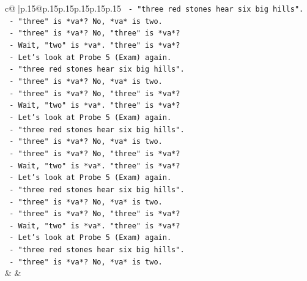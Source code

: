 \documentclass{article}
\begin{document}
{\begin{supertabular}{c@{$\;$}|p{.15\linewidth}@{}p{.15\linewidth}p{.15\linewidth}p{.15\linewidth}p{.15\linewidth}p{.15\linewidth}}
{{{\texttt{                                {-} "three red stones hear six big hills".} \\
\texttt{                                {-} "three" is *va*? No, *va* is two.} \\
\texttt{                                {-} "three" is *va*? No, "three" is *va*?} \\
\texttt{                                {-} Wait, "two" is *va*. "three" is *va*?} \\
\texttt{                                {-} Let's look at Probe 5 (Exam) again.} \\
\texttt{                                {-} "three red stones hear six big hills".} \\
\texttt{                                {-} "three" is *va*? No, *va* is two.} \\
\texttt{                                {-} "three" is *va*? No, "three" is *va*?} \\
\texttt{                                {-} Wait, "two" is *va*. "three" is *va*?} \\
\texttt{                                {-} Let's look at Probe 5 (Exam) again.} \\
\texttt{                                {-} "three red stones hear six big hills".} \\
\texttt{                                {-} "three" is *va*? No, *va* is two.} \\
\texttt{                                {-} "three" is *va*? No, "three" is *va*?} \\
\texttt{                                {-} Wait, "two" is *va*. "three" is *va*?} \\
\texttt{                                {-} Let's look at Probe 5 (Exam) again.} \\
\texttt{                                {-} "three red stones hear six big hills".} \\
\texttt{                                {-} "three" is *va*? No, *va* is two.} \\
\texttt{                                {-} "three" is *va*? No, "three" is *va*?} \\
\texttt{                                {-} Wait, "two" is *va*. "three" is *va*?} \\
\texttt{                                {-} Let's look at Probe 5 (Exam) again.} \\
\texttt{                                {-} "three red stones hear six big hills".} \\
\texttt{                                {-} "three" is *va*? No, *va* is two.} \\
            }
        }
    }
    & & \\ \\


\end{supertabular}}
\end{document}
